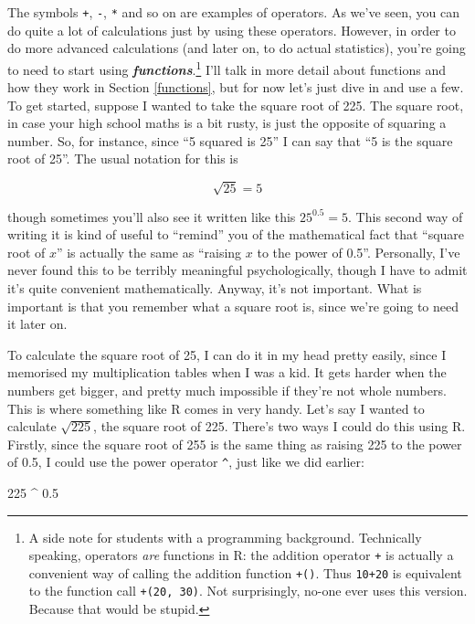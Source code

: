 \documentclass[
]{book}
\newenvironment{Shaded}{\begin{snugshade}}{\end{snugshade}}
\newcommand{\DecValTok}[1]{\textcolor[rgb]{0.00,0.00,0.81}{#1}}
\newcommand{\FloatTok}[1]{\textcolor[rgb]{0.00,0.00,0.81}{#1}}
\newcommand{\SpecialCharTok}[1]{\textcolor[rgb]{0.00,0.00,0.00}{#1}}
\begin{document}
The symbols \texttt{+}, \texttt{-}, \texttt{*} and so on are examples of operators. As we've seen, you can do quite a lot of calculations just by using these operators. However, in order to do more advanced calculations (and later on, to do actual statistics), you're going to need to start using \textbf{\emph{functions}}.\footnote{A side note for students with a programming background. Technically speaking, operators \emph{are} functions in R: the addition operator \texttt{+} is actually a convenient way of calling the addition function \texttt{+()}. Thus \texttt{10+20} is equivalent to the function call \texttt{+(20,\ 30)}. Not surprisingly, no-one ever uses this version. Because that would be stupid.} I'll talk in more detail about functions and how they work in Section \ref{functions}, but for now let's just dive in and use a few. To get started, suppose I wanted to take the square root of 225. The square root, in case your high school maths is a bit rusty, is just the opposite of squaring a number. So, for instance, since ``5 squared is 25'' I can say that ``5 is the square root of 25''. The usual notation for this is

\[
\sqrt{25} = 5
\]

though sometimes you'll also see it written like this
\(25^{0.5} = 5.\)
This second way of writing it is kind of useful to ``remind'' you of the mathematical fact that ``square root of \(x\)'' is actually the same as ``raising \(x\) to the power of 0.5''. Personally, I've never found this to be terribly meaningful psychologically, though I have to admit it's quite convenient mathematically. Anyway, it's not important. What is important is that you remember what a square root is, since we're going to need it later on.

To calculate the square root of 25, I can do it in my head pretty easily, since I memorised my multiplication tables when I was a kid. It gets harder when the numbers get bigger, and pretty much impossible if they're not whole numbers. This is where something like R comes in very handy. Let's say I wanted to calculate \(\sqrt{225}\), the square root of 225. There's two ways I could do this using R. Firstly, since the square root of 255 is the same thing as raising 225 to the power of 0.5, I could use the power operator \texttt{\^{}}, just like we did earlier:

\begin{Shaded}
\begin{Highlighting}[]
\DecValTok{225} \SpecialCharTok{\^{}} \FloatTok{0.5}
\end{Highlighting}
\end{Shaded}
\end{document}
